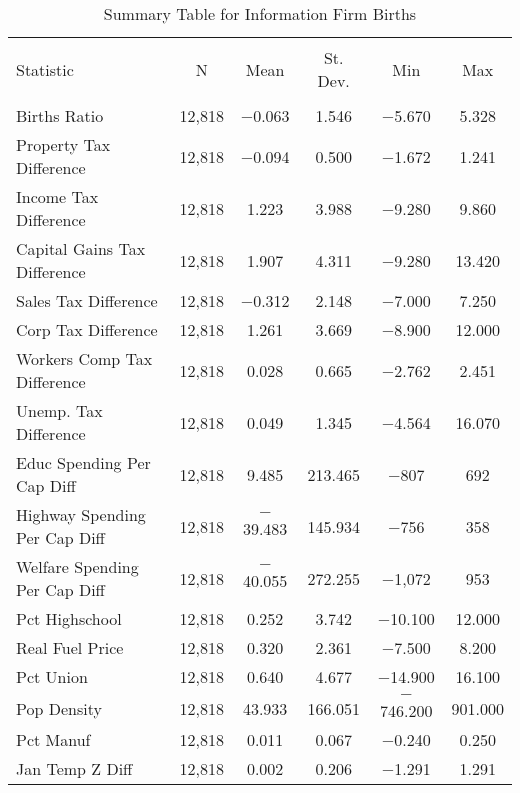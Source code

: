 
\begin{table}[!htbp] \centering 
  \caption{Summary Table for  Information Firm Births} 
  \label{51summary} 
\begin{tabular}{@{\extracolsep{5pt}}lccccc} 
\\[-1.8ex]\hline 
\hline \\[-1.8ex] 
Statistic & \multicolumn{1}{c}{N} & \multicolumn{1}{c}{Mean} & \multicolumn{1}{c}{St. Dev.} & \multicolumn{1}{c}{Min} & \multicolumn{1}{c}{Max} \\ 
\hline \\[-1.8ex] 
Births Ratio & 12,818 & $-$0.063 & 1.546 & $-$5.670 & 5.328 \\ 
Property Tax Difference & 12,818 & $-$0.094 & 0.500 & $-$1.672 & 1.241 \\ 
Income Tax Difference & 12,818 & 1.223 & 3.988 & $-$9.280 & 9.860 \\ 
Capital Gains Tax Difference & 12,818 & 1.907 & 4.311 & $-$9.280 & 13.420 \\ 
Sales Tax Difference & 12,818 & $-$0.312 & 2.148 & $-$7.000 & 7.250 \\ 
Corp Tax Difference & 12,818 & 1.261 & 3.669 & $-$8.900 & 12.000 \\ 
Workers Comp Tax Difference & 12,818 & 0.028 & 0.665 & $-$2.762 & 2.451 \\ 
Unemp. Tax Difference & 12,818 & 0.049 & 1.345 & $-$4.564 & 16.070 \\ 
Educ Spending Per Cap Diff & 12,818 & 9.485 & 213.465 & $-$807 & 692 \\ 
Highway Spending Per Cap Diff & 12,818 & $-$39.483 & 145.934 & $-$756 & 358 \\ 
Welfare Spending Per Cap Diff & 12,818 & $-$40.055 & 272.255 & $-$1,072 & 953 \\ 
Pct Highschool & 12,818 & 0.252 & 3.742 & $-$10.100 & 12.000 \\ 
Real Fuel Price & 12,818 & 0.320 & 2.361 & $-$7.500 & 8.200 \\ 
Pct Union & 12,818 & 0.640 & 4.677 & $-$14.900 & 16.100 \\ 
Pop Density & 12,818 & 43.933 & 166.051 & $-$746.200 & 901.000 \\ 
Pct Manuf & 12,818 & 0.011 & 0.067 & $-$0.240 & 0.250 \\ 
Jan Temp Z Diff & 12,818 & 0.002 & 0.206 & $-$1.291 & 1.291 \\ 

\end{tabular}
\end{table}
